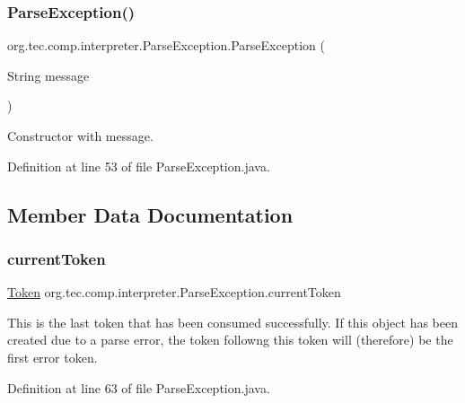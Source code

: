 \subsubsection{\texorpdfstring{Parse\+Exception()}{ParseException()}\hspace{0.1cm}{\footnotesize\ttfamily [3/3]}}
{\footnotesize\ttfamily org.\+tec.\+comp.\+interpreter.\+Parse\+Exception.\+Parse\+Exception (\begin{DoxyParamCaption}\item[{String}]{message }\end{DoxyParamCaption})\hspace{0.3cm}{\ttfamily [inline]}}

Constructor with message. 

Definition at line 53 of file Parse\+Exception.\+java.



\subsection{Member Data Documentation}
\mbox{\label{classorg_1_1tec_1_1comp_1_1interpreter_1_1_parse_exception_aa924715148660d033e7af99dd80c85d9}} 
\subsubsection{\texorpdfstring{current\+Token}{currentToken}}
{\footnotesize\ttfamily \mbox{\hyperlink{classorg_1_1tec_1_1comp_1_1interpreter_1_1_token}{Token}} org.\+tec.\+comp.\+interpreter.\+Parse\+Exception.\+current\+Token}

This is the last token that has been consumed successfully. If this object has been created due to a parse error, the token followng this token will (therefore) be the first error token. 

Definition at line 63 of file Parse\+Exception.\+java.

\mbox{\label{classorg_1_1tec_1_1comp_1_1interpreter_1_1_parse_exception_a18e94211451c840a115611e78ebff392}} 
